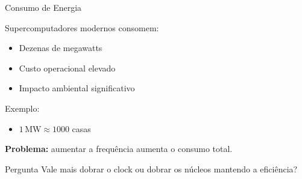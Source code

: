 \documentclass[aspectratio=169,11pt]{beamer}
\begin{document}

\begin{frame}{Consumo de Energia}

    Supercomputadores modernos consomem:

    \begin{itemize}
        \item Dezenas de megawatts
        \item Custo operacional elevado
        \item Impacto ambiental significativo
    \end{itemize}

    \vspace{0.15cm}

    Exemplo:

    \begin{itemize}
        \item $1\,\mathrm{MW} \approx 1000$ casas
    \end{itemize}

    \vspace{0.15cm}

    \textbf{Problema:}
    aumentar a frequência aumenta o consumo total.

    \vspace{0.30cm}

    \begin{questionbox}{Pergunta}
        Vale mais dobrar o clock ou dobrar os núcleos
        mantendo a eficiência?
    \end{questionbox}

\end{frame}


\end{document}
